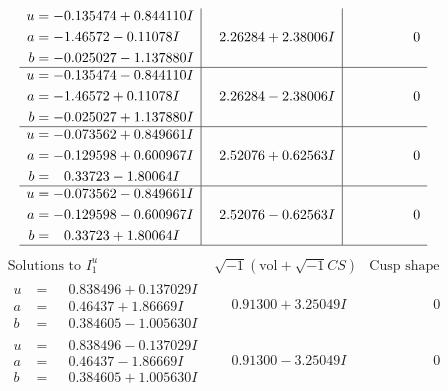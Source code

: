 \documentclass[1p]{elsarticle_modified}
\theoremstyle{definition}
\newcommand{\I}{\sqrt{-1}}
\begin{document}
$$\begin{array}{c|c|c}
\begin{aligned}
u &= -0.135474 + 0.844110 I \\
a &= -1.46572 - 0.11078 I \\
b &= -0.025027 - 1.137880 I\end{aligned}
 & \phantom{-}2.26284 + 2.38006 I & \phantom{-0.000000 } 0 \\ \hline\begin{aligned}
u &= -0.135474 - 0.844110 I \\
a &= -1.46572 + 0.11078 I \\
b &= -0.025027 + 1.137880 I\end{aligned}
 & \phantom{-}2.26284 - 2.38006 I & \phantom{-0.000000 } 0 \\ \hline\begin{aligned}
u &= -0.073562 + 0.849661 I \\
a &= -0.129598 + 0.600967 I \\
b &= \phantom{-}0.33723 - 1.80064 I\end{aligned}
 & \phantom{-}2.52076 + 0.62563 I & \phantom{-0.000000 } 0 \\ \hline\begin{aligned}
u &= -0.073562 - 0.849661 I \\
a &= -0.129598 - 0.600967 I \\
b &= \phantom{-}0.33723 + 1.80064 I\end{aligned}
 & \phantom{-}2.52076 - 0.62563 I & \phantom{-0.000000 } 0\\
 \hline 
 \end{array}$$\newpage$$\begin{array}{c|c|c}  
\text{Solutions to }I^u_{1}& \I (\text{vol} + \sqrt{-1}CS) & \text{Cusp shape}\\
 \hline 
\begin{aligned}
u &= \phantom{-}0.838496 + 0.137029 I \\
a &= \phantom{-}0.46437 + 1.86669 I \\
b &= \phantom{-}0.384605 - 1.005630 I\end{aligned}
 & \phantom{-}0.91300 + 3.25049 I & \phantom{-0.000000 } 0 \\ \hline\begin{aligned}
u &= \phantom{-}0.838496 - 0.137029 I \\
a &= \phantom{-}0.46437 - 1.86669 I \\
b &= \phantom{-}0.384605 + 1.005630 I\end{aligned}
 & \phantom{-}0.91300 - 3.25049 I & \phantom{-0.000000 } 0 \\ \hline\begin{aligned}

\end{aligned}
\end{array}$$
\end{document}

